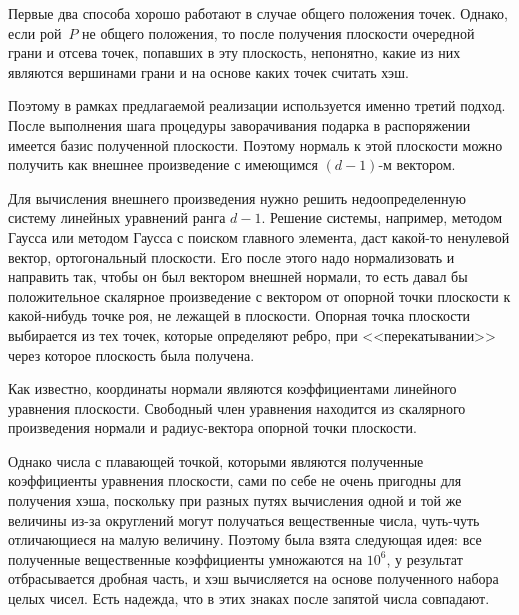 \documentclass[14pt]{extarticle}
\begin{document}
Первые два способа хорошо работают в случае общего положения точек. Однако, если рой~$P$ не общего положения, то после получения плоскости очередной грани и отсева точек, попавших в эту плоскость, непонятно, какие из них являются вершинами грани и на основе каких точек считать хэш.

Поэтому в рамках предлагаемой реализации используется именно третий подход. После выполнения шага процедуры заворачивания подарка в распоряжении имеется базис полученной плоскости. Поэтому нормаль к этой плоскости можно получить как внешнее произведение с имеющимся $(d-1)$-м вектором.

Для вычисления внешнего произведения нужно решить недоопределенную систему линейных уравнений ранга $d-1$. Решение системы, например, методом Гаусса или методом Гаусса с поиском главного элемента, даст какой-то ненулевой вектор, ортогональный плоскости. Его после этого надо нормализовать и направить так, чтобы он был вектором внешней нормали, то есть давал бы положительное скалярное произведение с вектором от опорной точки плоскости к какой-нибудь точке роя, не лежащей в плоскости. Опорная точка плоскости выбирается из тех точек, которые определяют ребро, при <<перекатывании>> через которое плоскость была получена.

Как известно, координаты нормали являются коэффициентами линейного уравнения плоскости. Свободный член уравнения находится из скалярного произведения нормали и радиус-вектора опорной точки плоскости.

Однако числа с плавающей точкой, которыми являются полученные коэффициенты уравнения плоскости, сами по себе не очень пригодны для получения хэша, поскольку при разных путях вычисления одной и той же величины из-за округлений могут получаться вещественные  числа, чуть-чуть отличающиеся на малую величину. Поэтому была взята следующая идея: все полученные вещественные коэффициенты умножаются на $10^6$, у результат отбрасывается дробная часть, и хэш вычисляется на основе полученного набора целых чисел. Есть надежда, что в этих знаках после запятой числа совпадают.
\end{document}
